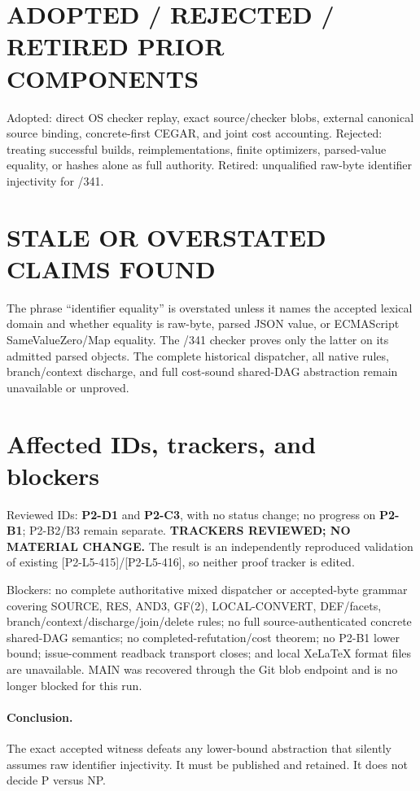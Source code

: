 \documentclass[11pt]{article}
\begin{document}
\section{ADOPTED / REJECTED / RETIRED PRIOR COMPONENTS}
Adopted: direct OS checker replay, exact source/checker blobs, external canonical source binding, concrete-first CEGAR, and joint cost accounting.  Rejected: treating successful builds, reimplementations, finite optimizers, parsed-value equality, or hashes alone as full authority.  Retired: unqualified raw-byte identifier injectivity for /341.

\section{STALE OR OVERSTATED CLAIMS FOUND}
The phrase ``identifier equality'' is overstated unless it names the accepted lexical domain and whether equality is raw-byte, parsed JSON value, or ECMAScript SameValueZero/Map equality.  The /341 checker proves only the latter on its admitted parsed objects.  The complete historical dispatcher, all native rules, branch/context discharge, and full cost-sound shared-DAG abstraction remain unavailable or unproved.

\section{Affected IDs, trackers, and blockers}
Reviewed IDs: \textbf{P2-D1} and \textbf{P2-C3}, with no status change; no progress on \textbf{P2-B1}; P2-B2/B3 remain separate.  \textbf{TRACKERS REVIEWED; NO MATERIAL CHANGE.}  The result is an independently reproduced validation of existing [P2-L5-415]/[P2-L5-416], so neither proof tracker is edited.

Blockers: no complete authoritative mixed dispatcher or accepted-byte grammar covering SOURCE, RES, AND3, GF(2), LOCAL-CONVERT, DEF/facets, branch/context/discharge/join/delete rules; no full source-authenticated concrete shared-DAG semantics; no completed-refutation/cost theorem; no P2-B1 lower bound; issue-comment readback transport closes; and local XeLaTeX format files are unavailable.  MAIN was recovered through the Git blob endpoint and is no longer blocked for this run.

\paragraph{Conclusion.}  The exact accepted witness defeats any lower-bound abstraction that silently assumes raw identifier injectivity.  It must be published and retained.  It does not decide P versus NP.

\end{document}
